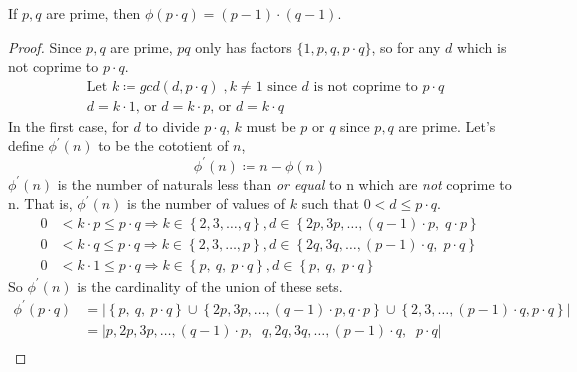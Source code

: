 \begin{theorem}
    If $p, q$ are prime, then $\phi(p \cdot q) = (p-1) \cdot (q-1)$.
    \begin{proof}
        Since $p, q$ are prime, $pq$ only has factors $\{1, p, q, p \cdot q\}$, so for any $d$ which is not coprime to $p \cdot q$.
        \begin{align*}
             & \text{Let }k \coloneqq gcd(d, p \cdot q) \;, k \neq 1 \text{ since } d \text{ is not coprime to } p \cdot q \\
             & d = k \cdot 1 \text{, or } d = k \cdot p \text{, or } d = k \cdot q
        \end{align*}
        In the first case, for $d$ to divide $p \cdot q$, $k$ must be $p$ or $q$ since $p, q$ are prime.
        Let's define $\phi^{'}(n)$ to be the cototient of $n$,
        \[
            \phi^{'}(n) \coloneqq n - \phi(n)
        \]
        $\phi^{'}(n)$ is the number of naturals less than \emph{or equal} to n which are \emph{not} coprime to n.
        That is, $\phi^{'}(n)$ is the number of values of $k$ such that $0 < d \leq p \cdot q$.
        \begin{align*}
            0 & < k \cdot p \leq p \cdot q \Rightarrow k \in \left\{ 2, 3, \ldots, q \right\},     d \in \left\{2p,   3p, \ldots, (q-1) \cdot p, \; q \cdot p \right\} \\
            0 & < k \cdot q \leq p \cdot q \Rightarrow k \in \left\{ 2, 3, \ldots, p \right\},     d \in \left\{2q,   3q, \ldots, (p-1) \cdot q, \; p \cdot q \right\} \\
            0 & < k \cdot 1 \leq p \cdot q \Rightarrow k \in \left\{ p,\: q,\: p \cdot q \right\}, d \in \left\{ p, \: q,                        \; p \cdot q \right\}
        \end{align*}
        So $\phi^{'}(n)$ is the cardinality of the union of these sets.
        \begin{align*}
            \phi^{'}(p \cdot q)         & = \left| \left\{p,\: q,\: p\cdot q \right\} \cup \left\{ 2p, 3p, \ldots, (q-1) \cdot p, q \cdot p \right\} \cup \left\{ 2, 3, \ldots,  (p-1) \cdot q, p \cdot q \right\} \right| \\
                                        & = \left| p, 2p, 3p, \ldots, (q-1) \cdot p, \;\; q, 2q, 3q, \ldots, (p-1) \cdot q, \;\; p \cdot q\right|                                                                          \\

\end{align*}
\end{proof}
\end{theorem}

